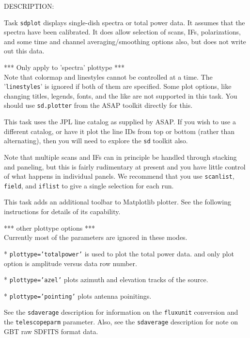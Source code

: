     DESCRIPTION:
    
        Task {\tt sdplot} displays single-dish spectra or total power data.
        It assumes that the spectra have been calibrated.
        It does allow selection of scans, IFs, polarizations, and
        some time and channel averaging/smoothing options also,
        but does not write out this data.

        *** Only apply to 'spectra' plottype ***\\
        Note that colormap and linestyles cannot be controlled at a time.
        The '{\tt linestyles}' is ignored if both of them are specified.
        Some plot options, like changing titles, legends, fonts,
        and the like are not supported in this task.  You should use
        {\tt sd.plotter} from the ASAP toolkit directly for this.

        This task uses the JPL line catalog as supplied by ASAP.
        If you wish to use a different catalog, or have it plot
        the line IDs from top or bottom (rather than alternating),
        then you will need to explore the {\tt sd} toolkit also.

        Note that multiple scans and IFs can in principle be handled
        through stacking and paneling, but this is fairly rudimentary
        at present and you have little control of what happens in
        individual panels.  We recommend that you use {\tt scanlist}, {\tt field},
        and {\tt iflist} to give a single selection for each run.

        This task adds an additional toolbar to Matplotlib plotter. See the following 
        instructions for details of its capability.

        *** other plottype options ***\\
        Currently most of the parameters are ignored in these modes.

        * {\tt plottype='totalpower'} is used to plot the total power data.
          and only plot option is amplitude versus data row number.

        * {\tt plottype='azel'} plots azimuth and elevation tracks of the source.

        * {\tt plottype='pointing'} plots antenna poinitings.

        See the {\tt sdaverage} description for information on the {\tt fluxunit} conversion
        and the {\tt telescopeparm} parameter.
        Also, see the {\tt sdaverage} description for note on GBT raw SDFITS format data.

